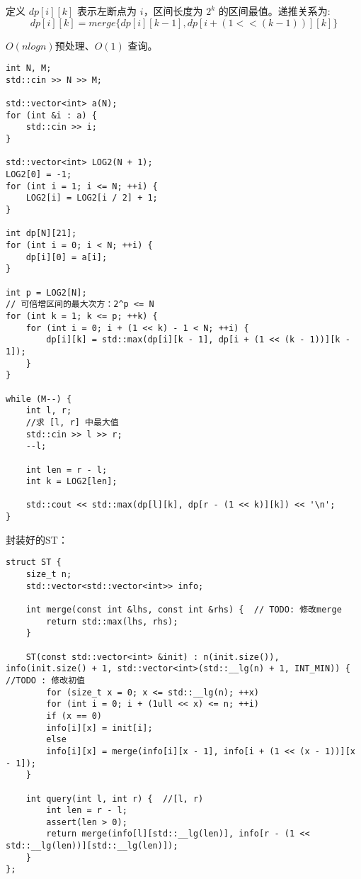 定义 $dp[i][k]$ 表示左断点为 $i$，区间长度为 $2^k$ 的区间最值。递推关系为:
$$dp[i][k] = merge\{dp[i][k - 1], dp[i + (1 << (k - 1))][k]\}$$

$O(nlogn)$预处理、$O(1)$ 查询。
\begin{lstlisting}
int N, M;
std::cin >> N >> M;

std::vector<int> a(N);
for (int &i : a) {
	std::cin >> i;
}

std::vector<int> LOG2(N + 1);
LOG2[0] = -1;
for (int i = 1; i <= N; ++i) {
	LOG2[i] = LOG2[i / 2] + 1;
}

int dp[N][21];
for (int i = 0; i < N; ++i) {
	dp[i][0] = a[i];
}

int p = LOG2[N];  
// 可倍增区间的最大次方：2^p <= N
for (int k = 1; k <= p; ++k) {
	for (int i = 0; i + (1 << k) - 1 < N; ++i) {
		dp[i][k] = std::max(dp[i][k - 1], dp[i + (1 << (k - 1))][k - 1]);
	}
}

while (M--) {
	int l, r;
	//求 [l, r] 中最大值
	std::cin >> l >> r;
	--l;
	
	int len = r - l;
	int k = LOG2[len];
	
	std::cout << std::max(dp[l][k], dp[r - (1 << k)][k]) << '\n';
}
\end{lstlisting}

封装好的ST：
\begin{lstlisting}
struct ST {
	size_t n;
	std::vector<std::vector<int>> info;
	
	int merge(const int &lhs, const int &rhs) {  // TODO: 修改merge
		return std::max(lhs, rhs);
	}
	
	ST(const std::vector<int> &init) : n(init.size()), info(init.size() + 1, std::vector<int>(std::__lg(n) + 1, INT_MIN)) {  //TODO : 修改初值
		for (size_t x = 0; x <= std::__lg(n); ++x)
		for (int i = 0; i + (1ull << x) <= n; ++i)
		if (x == 0)
		info[i][x] = init[i];
		else
		info[i][x] = merge(info[i][x - 1], info[i + (1 << (x - 1))][x - 1]);
	}
	
	int query(int l, int r) {  //[l, r)
		int len = r - l;
		assert(len > 0);
		return merge(info[l][std::__lg(len)], info[r - (1 << std::__lg(len))][std::__lg(len)]);
	}
};
\end{lstlisting}